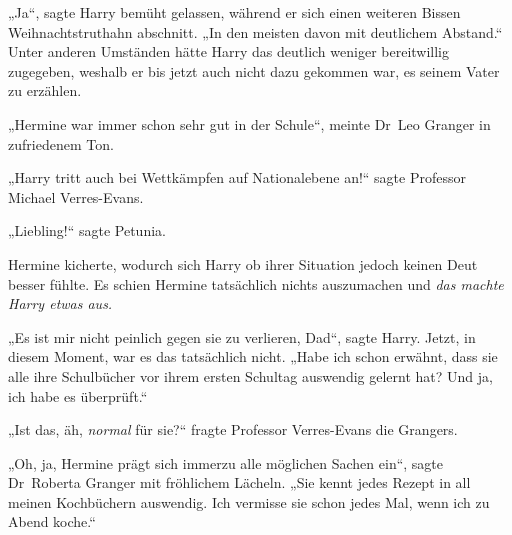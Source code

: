 „Ja“, sagte Harry bemüht gelassen, während er sich einen weiteren Bissen Weihnachtstruthahn abschnitt.
„In den meisten davon mit deutlichem Abstand.“ Unter anderen Umständen hätte Harry das deutlich weniger bereitwillig zugegeben, weshalb er bis jetzt auch nicht dazu gekommen war, es seinem Vater zu erzählen.

„Hermine war immer schon sehr gut in der Schule“, meinte Dr~Leo Granger in zufriedenem Ton.

„Harry tritt auch bei Wettkämpfen auf Nationalebene an!“ sagte Professor Michael Verres-Evans.

„Liebling!“ sagte Petunia.

Hermine kicherte, wodurch sich Harry ob ihrer Situation jedoch keinen Deut besser fühlte. Es schien Hermine tatsächlich nichts auszumachen und \emph{das machte Harry etwas aus.}

„Es ist mir nicht peinlich gegen sie zu verlieren, Dad“, sagte Harry. Jetzt, in diesem Moment, war es das tatsächlich nicht.
„Habe ich schon erwähnt, dass sie alle ihre Schulbücher vor ihrem ersten Schultag auswendig gelernt hat? Und ja, ich habe es überprüft.“

„Ist das, äh, \emph{normal} für sie?“ fragte Professor Verres-Evans die Grangers.

„Oh, ja, Hermine prägt sich immerzu alle möglichen Sachen ein“, sagte Dr~Roberta Granger mit fröhlichem Lächeln.
„Sie kennt jedes Rezept in all meinen Kochbüchern auswendig. Ich vermisse sie schon jedes Mal, wenn ich zu Abend koche.“

